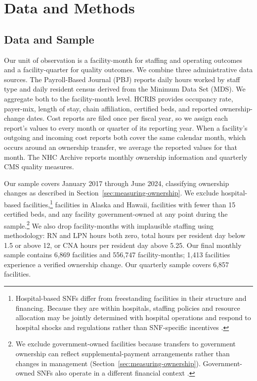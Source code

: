 \documentclass[12pt]{article}
\begin{document}
\section{Data and Methods} \label{sec:dataandmethods}

\subsection{Data and Sample} \label{sec:dataandsample}

Our unit of observation is a facility-month for staffing and operating outcomes and a facility-quarter for quality outcomes. We combine three administrative data sources. The Payroll-Based Journal (PBJ) reports daily hours worked by staff type and daily resident census derived from the Minimum Data Set (MDS). We aggregate both to the facility-month level. HCRIS provides occupancy rate, payer-mix, length of stay, chain affiliation, certified beds, and reported ownership-change dates. Cost reports are filed once per fiscal year, so we assign each report's values to every month or quarter of its reporting year. When a facility's outgoing and incoming cost reports both cover the same calendar month, which occurs around an ownership transfer, we average the reported values for that month. The NHC Archive reports monthly ownership information and quarterly CMS quality measures.

Our sample covers January 2017 through June 2024, classifying ownership changes as described in Section~\ref{sec:measuring-ownership}. We exclude hospital-based facilities,\footnote{Hospital-based SNFs differ from freestanding facilities in their structure and financing. Because they are within hospitals, staffing policies and resource allocation may be jointly determined with hospital operations and respond to hospital shocks and regulations rather than SNF-specific incentives \citep{MedPAC2026Report}.} facilities in Alaska and Hawaii, facilities with fewer than 15 certified beds, and any facility government-owned at any point during the sample.\footnote{We exclude government-owned facilities because transfers to government ownership can reflect supplemental-payment arrangements rather than changes in management (Section~\ref{sec:measuring-ownership}). Government-owned SNFs also operate in a different financial context \citep{MedPAC2026Report}.} We also drop facility-months with implausible staffing using \citet{cms_fivestar_2026} methodology: RN and LPN hours both zero, total hours per resident day below 1.5 or above 12, or CNA hours per resident day above 5.25. Our final monthly sample contains 6,869 facilities and 556,747 facility-months; 1,413 facilities experience a verified ownership change. Our quarterly sample covers 6,857 facilities.
\end{document}
